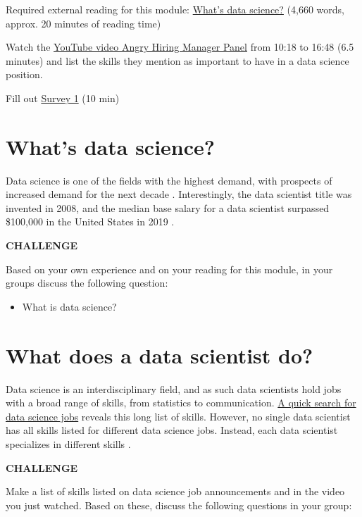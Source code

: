 \documentclass[
]{book}
\providecommand{\tightlist}{%
  \setlength{\itemsep}{0pt}\setlength{\parskip}{0pt}}
\begin{document}
Required external reading for this module: \href{readings/module2_what_is_data_science.pdf}{What's data science?} (4,660 words, approx. 20 minutes of reading time)

Watch the \href{https://youtu.be/6OFm7YcunWc?t=617}{YouTube video Angry Hiring Manager Panel} from 10:18 to 16:48 (6.5 minutes) and list the skills they mention as important to have in a data science position.

Fill out \href{https://forms.gle/NaqrC87cB8xh6Sdz8}{Survey 1} (10 min)

\hypertarget{whats-data-science}{%
\section{What's data science?}\label{whats-data-science}}

Data science is one of the fields with the highest demand, with prospects of increased demand for the next decade \citep{kross2020democratization, hadavand2018can}. Interestingly, the data scientist title was invented in 2008, and the median base salary for a data scientist surpassed \$100,000 in the United States in 2019 \citep{robinson_nolis_2020}.

\textbf{CHALLENGE}

Based on your own experience and on your reading for this module, in your groups discuss the following question:

\begin{itemize}
\tightlist
\item
  What is data science?
\end{itemize}

\hypertarget{what-does-a-data-scientist-do}{%
\section{What does a data scientist do?}\label{what-does-a-data-scientist-do}}

Data science is an interdisciplinary field, and as such data scientists hold jobs with a broad range of skills, from statistics to communication. \href{https://www.indeed.com/jobs?q=data+science\&l=United+States}{A quick search for data science jobs} reveals this long list of skills. However, no single data scientist has all skills listed for different data science jobs. Instead, each data scientist specializes in different skills \citep{robinson_nolis_2020}.

\textbf{CHALLENGE}

Make a list of skills listed on data science job announcements and in the video you just watched. Based on these, discuss the following questions in your group:
\end{document}
